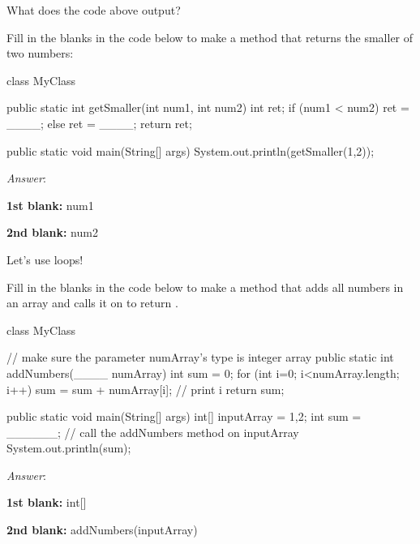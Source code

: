 What does the code above output?

\begin{example}
Fill in the blanks in the code below to make a method that returns the smaller of two numbers:

\begin{code}
class MyClass {

  public static int getSmaller(int num1, int num2) {
    int ret;
    if (num1 < num2) {
        ret = ____;
    }
    else {
        ret = ____;
    }
    return ret; 
  }

  public static void main(String[] args) {
    System.out.println(getSmaller(1,2));
  }
}
\end{code}

\noindent \emph{Answer}:

\textbf{1st blank:} num1

\textbf{2nd blank:} num2
\end{example}

Let's use loops!

\begin{example}
Fill in the blanks in the code below to make a method that adds all numbers in an array and calls it on  to return . 

\begin{code}
class MyClass {
  // make sure the parameter numArray's type is integer array
  public static int addNumbers(____ numArray) {
    int sum = 0;
    for (int i=0; i<numArray.length; i++) {
      sum = sum + numArray[i]; // print i
    }
    return sum; 
  }

  public static void main(String[] args) {
    int[] inputArray = {1,2};
    int sum = ______; // call the addNumbers method on inputArray
    System.out.println(sum);
  }
}
\end{code}

\noindent \emph{Answer}:

\textbf{1st blank:} int[] 

\textbf{2nd blank:} addNumbers(inputArray)
\end{example}



